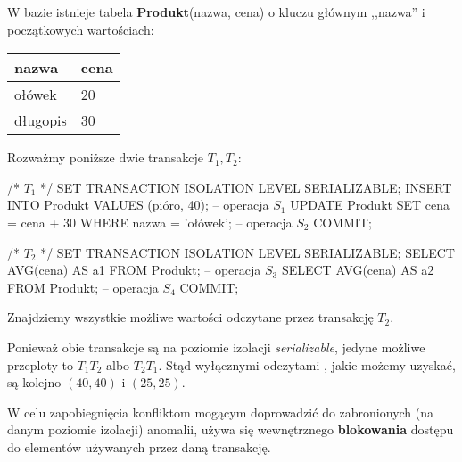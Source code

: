 \begin{example}
    W bazie istnieje tabela \textbf{Produkt}(nazwa, cena) o kluczu głównym ,,nazwa'' i początkowych wartościach:
    \begin{center}
        \renewcommand{\arraystretch}{1.5}
        \begin{tabular}{ C | C}
        nazwa & cena \\ \hline
        ołówek & 20 \\
        długopis & 30
        \end{tabular}
    \end{center}
    
    Rozważmy poniższe dwie transakcje $T_1, T_2$:
    \begin{sql}
    /* $T_1$ */
    SET TRANSACTION ISOLATION LEVEL SERIALIZABLE;
    INSERT INTO Produkt VALUES (pióro, 40);                         -- operacja $S_1$
    UPDATE Produkt SET cena = cena + 30 WHERE nazwa = 'ołówek';     -- operacja $S_2$
    COMMIT;
    
    /* $T_2$ */
    SET TRANSACTION ISOLATION LEVEL SERIALIZABLE;
    SELECT AVG(cena) AS a1 FROM Produkt;    -- operacja $S_3$
    SELECT AVG(cena) AS a2 FROM Produkt;    -- operacja $S_4$
    COMMIT;
\end{sql}

Znajdziemy wszystkie możliwe wartości  odczytane przez transakcję $T_2$.

Ponieważ obie transakcje są na poziomie izolacji \textit{serializable}, jedyne możliwe przeploty to $T_1T_2$ albo $T_2T_1$. Stąd wyłącznymi odczytami , jakie możemy uzyskać, są kolejno $(40, 40)$ i $(25, 25)$.
\end{example}

W celu zapobiegnięcia konfliktom mogącym doprowadzić do zabronionych (na danym poziomie izolacji) anomalii, używa się wewnętrznego \textbf{blokowania} dostępu do elementów używanych przez daną transakcję.

